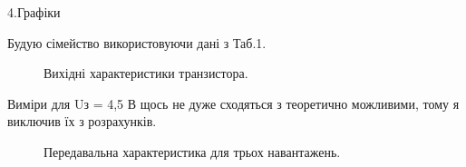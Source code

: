 \documentclass[a4paper,14pt]{extreport}
\begin{document}
\newpage
\begin{center}4.Графіки\\ \end{center}
Будую сімейство використовуючи дані з Таб.1.

\begin{figure}[h]
\caption{Вихідні характеристики транзистора.}
\end{figure}
Виміри для Uз = 4,5 В щось не дуже сходяться з теоретично можливими, тому я виключив їх з розрахунків.

\begin{figure}[h]
\caption{Передавальна характеристика для трьох навантажень.}
\label{graf2}
\end{figure}
\end{document}
